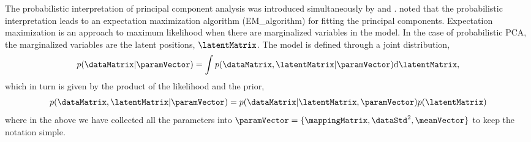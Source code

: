 The probabilistic interpretation of principal component analysis was
introduced simultaneously by \cite{Roweis:SPCA97} and
\cite{Tipping:probpca99}. \citealp{Roweis:SPCA97} noted that the
probabilistic interpretation leads to an expectation maximization
algorithm (\gls{EM_algorithm}) for fitting the principal
components. Expectation maximization \citep{Dempster:EM77} is an approach to maximum
likelihood when there are marginalized variables in the model. In the
case of probabilistic PCA, the marginalized variables are the latent
positions, $\latentMatrix$. The model is defined through a joint
distribution,
\[
p(\dataMatrix|\paramVector) = \int p(\dataMatrix,
\latentMatrix|\paramVector) \text{d}\latentMatrix,
\]
which in turn is given by the product of the likelihood and the prior,
\[
p(\dataMatrix, \latentMatrix|\paramVector) = p(\dataMatrix |
\latentMatrix, \paramVector) p(\latentMatrix)
\]
where in the above we have collected all the parameters into
$\paramVector=\{\mappingMatrix, \dataStd^2, \meanVector\}$ to keep the
notation simple.

